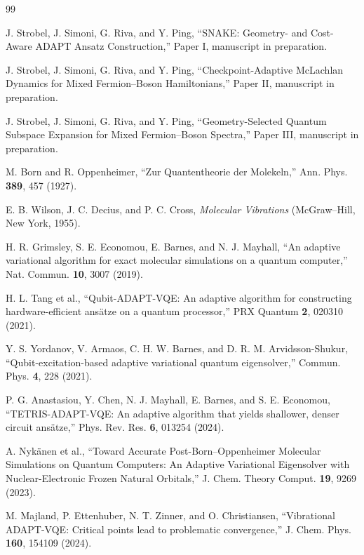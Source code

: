 \documentclass[
  reprint,
  amsmath,
  amssymb,
  aps,
  pra,
  nofootinbib,
  superscriptaddress,
  floatfix
]{revtex4-2}
\begin{document}
\begin{thebibliography}{99}

J. Strobel, J. Simoni, G. Riva, and Y. Ping,
``SNAKE: Geometry- and Cost-Aware ADAPT Ansatz Construction,''
Paper I, manuscript in preparation.

J. Strobel, J. Simoni, G. Riva, and Y. Ping,
``Checkpoint-Adaptive McLachlan Dynamics for Mixed Fermion--Boson Hamiltonians,''
Paper II, manuscript in preparation.

J. Strobel, J. Simoni, G. Riva, and Y. Ping,
``Geometry-Selected Quantum Subspace Expansion for Mixed Fermion--Boson Spectra,''
Paper III, manuscript in preparation.

M. Born and R. Oppenheimer,
``Zur Quantentheorie der Molekeln,''
Ann. Phys. \textbf{389}, 457 (1927).

E. B. Wilson, J. C. Decius, and P. C. Cross,
\emph{Molecular Vibrations}
(McGraw--Hill, New York, 1955).

H. R. Grimsley, S. E. Economou, E. Barnes, and N. J. Mayhall,
``An adaptive variational algorithm for exact molecular simulations on a quantum computer,''
Nat. Commun. \textbf{10}, 3007 (2019).

H. L. Tang et al.,
``Qubit-ADAPT-VQE: An adaptive algorithm for constructing hardware-efficient ans\"atze on a quantum processor,''
PRX Quantum \textbf{2}, 020310 (2021).

Y. S. Yordanov, V. Armaos, C. H. W. Barnes, and D. R. M. Arvidsson-Shukur,
``Qubit-excitation-based adaptive variational quantum eigensolver,''
Commun. Phys. \textbf{4}, 228 (2021).

P. G. Anastasiou, Y. Chen, N. J. Mayhall, E. Barnes, and S. E. Economou,
``TETRIS-ADAPT-VQE: An adaptive algorithm that yields shallower, denser circuit ans\"atze,''
Phys. Rev. Res. \textbf{6}, 013254 (2024).

A. Nyk\"anen et al.,
``Toward Accurate Post-Born--Oppenheimer Molecular Simulations on Quantum Computers: An Adaptive Variational Eigensolver with Nuclear-Electronic Frozen Natural Orbitals,''
J. Chem. Theory Comput. \textbf{19}, 9269 (2023).

M. Majland, P. Ettenhuber, N. T. Zinner, and O. Christiansen,
``Vibrational ADAPT-VQE: Critical points lead to problematic convergence,''
J. Chem. Phys. \textbf{160}, 154109 (2024).


\end{thebibliography}
\end{document}
